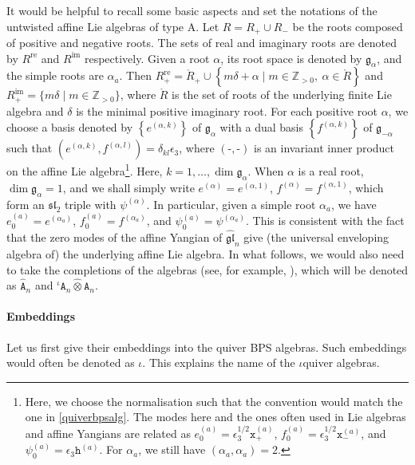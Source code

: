 \documentclass[11pt]{article}
\numberwithin{equation}{section}
\numberwithin{figure}{section}
\numberwithin{table}{section}
\begin{document}
It would be helpful to recall some basic aspects and set the notations of the untwisted affine Lie algebras of type A. Let $R=R_+\cup R_-$ be the roots composed of positive and negative roots. The sets of real and imaginary roots are denoted by $R^{\text{re}}$ and $R^{\text{im}}$ respectively. Given a root $\alpha$, its root space is denoted by $\mathfrak{g}_\alpha$, and the simple roots are $\alpha_a$. Then $R^\text{re}_+=\mathring{R}_+\cup\left\{m\delta+\alpha\;|\;m\in\mathbb{Z}_{>0},~\alpha\in\mathring{R}\right\}$ and $R^\text{im}_+=\{m\delta\;|\;m\in\mathbb{Z}_{>0}\}$, where $\mathring{R}$ is the set of roots of the underlying finite Lie algebra and $\delta$ is the minimal positive imaginary root. For each positive root $\alpha$, we choose a basis denoted by $\left\{e^{(\alpha,k)}\right\}$ of $\mathfrak{g}_\alpha$ with a dual basis $\left\{f^{(\alpha,k)}\right\}$ of $\mathfrak{g}_{-\alpha}$ such that $\left(e^{(\alpha,k)},f^{(\alpha,l)}\right)=\delta_{kl}\epsilon_3$, where $(\text{-},\text{-})$ is an invariant inner product on the affine Lie algebra\footnote{Here, we choose the normalisation such that the convention would match the one in \cref{quiverbpsalg}. The modes here and the ones often used in Lie algebras and affine Yangians are related as $e^{(a)}_0=\epsilon_3^{1/2}\mathtt{x}_+^{(a)}$, $f^{(a)}_0=\epsilon_3^{1/2}\mathtt{x}_-^{(a)}$, and $\psi^{(a)}_0=\epsilon_3\mathtt{h}^{(a)}$. For $\alpha_a$, we still have $(\alpha_a,\alpha_a)=2$.}. Here, $k=1,\dots,\dim\mathfrak{g}_\alpha$. When $\alpha$ is a real root, $\dim\mathfrak{g}_\alpha=1$, and we shall simply write $e^{(\alpha)}=e^{(\alpha,1)}$, $f^{(\alpha)}=f^{(\alpha,1)}$, which form an $\mathfrak{sl}_2$ triple with $\psi^{(\alpha)}$. In particular, given a simple root $\alpha_a$, we have $e^{(a)}_0=e^{\left(\alpha_a\right)}$, $f^{(a)}_0=f^{\left(\alpha_a\right)}$, and $\psi^{(a)}_0=\psi^{\left(\alpha_a\right)}$. This is consistent with the fact that the zero modes of the affine Yangian of $\widehat{\mathfrak{gl}}_n$ give (the universal enveloping algebra of) the underlying affine Lie algebra. In what follows, we would also need to take the completions of the algebras (see, for example, \cite{guay2018coproduct,ueda2023construction}), which will be denoted as $\widehat{\mathtt{A}}_n$ and ${}^\iota\mathtt{A}_n\widehat{\otimes}\mathtt{A}_n$.

\paragraph{Embeddings} Let us first give their embeddings into the quiver BPS algebras. Such embeddings would often be denoted as $\iota$. This explains the name of the $\iota$quiver algebras.
\end{document}
